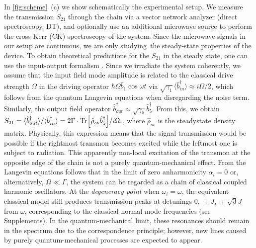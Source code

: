 \documentclass[%
 aps, pra,
 amsmath,amssymb,
 reprint,%
superscriptaddress
]{revtex4-2}
\begin{document}
In \autoref{fig:scheme}~(c) we show schematically the experimental setup. We measure the transmission $S_{21}$ through the chain via a vector network analyzer (direct spectroscopy, DT), and optionally use an additional microwave source to perform the cross-Kerr (CK) spectroscopy of the system. Since the microwave signals in our setup are continuous, we are only studying the steady-state properties of the device. To obtain theoretical predictions for the $S_{21}$ in the steady state, one can use the input-output formalism \cite{yurke1984quantum,gardiner1985input}. Since we irradiate the system coherently, we assume that the input field mode amplitude is related to the classical drive strength $\Omega$ in the driving operator $\hbar \Omega \hat b_1 \cos \omega t$ via $\sqrt{\gamma_1} \langle  \hat b_{in}^\dag \rangle \approx i \Omega/2$, which follows from the quantum Langevin equations when disregarding the noise term. Similarly, the output field operator $\hat b_{out}^\dag \approx \sqrt{\gamma_5} \hat b_5^\dag$. From this, we obtain $
	S_{21} = \langle \hat b_{out}^\dag\rangle / \langle \hat b_{in}^\dag \rangle = 2\Gamma\cdot \Tr[\hat \rho_{ss} \hat b_5^\dag]/{i\Omega} ,
$,
where $\hat \rho_{ss}$ is the steadystate density matrix. Physically, this expression means that the signal transmission would be possible if the rightmost transmon becomes excited while the leftmost one is subject to radiation. This apparently non-local excitation of the transmon at the opposite edge of the chain is not a purely quantum-mechanical effect. From the Langevin equations follows that in the limit of zero anharmonicity $\alpha_i = 0$ or, alternatively, $\Omega \ll \Gamma$, the system can be regarded as a chain of classical coupled harmonic oscillators. At the \textit{degeneracy point} when $\omega_i = \omega$, the equivalent classical model still produces transmission peaks at detunings $0,\, \pm J,\, \pm \sqrt{3} J$ from $\omega$, corresponding to the classical normal mode frequencies (see Supplements). In the quantum-mechanical limit, these resonances should remain in the spectrum due to the correspondence principle; however, new lines caused by purely quantum-mechanical processes are expected to appear.
\end{document}
